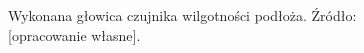 \begin{figure}[h]
	\centering
	\setlength{\fboxsep}{0pt}
	\setlength{\fboxrule}{1pt}
	\caption{Wykonana głowica czujnika wilgotności podłoża. Źródło: [opracowanie własne].} 
	\label{fig:czujnik wilg}
\end{figure}